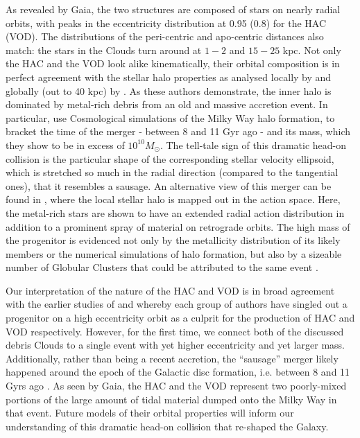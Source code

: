 \documentclass[fleqn,usenatbib]{mnras}
\begin{document}
As revealed by Gaia, the two structures are composed of stars on
nearly radial orbits, with peaks in the eccentricity distribution at
0.95 (0.8) for the HAC (VOD). The distributions of the peri-centric
and apo-centric distances also match: the stars in the Clouds turn
around at $1-2$ and $15-25$ kpc. Not only the HAC and the VOD look
alike kinematically, their orbital composition is in perfect agreement
with the stellar halo properties as analysed locally by
\citet{Belokurov2018} and globally (out to 40 kpc) by
\citet{Deason2018pileup}. As these authors demonstrate, the inner halo
is dominated by metal-rich debris from an old and massive accretion
event. In particular, \citet{Belokurov2018} use Cosmological
simulations of the Milky Way halo formation, to bracket the time of
the merger - between 8 and 11 Gyr ago - and its mass, which they show
to be in excess of $10^{10} M_{\odot}$. The tell-tale sign of this
dramatic head-on collision is the particular shape of the
corresponding stellar velocity ellipsoid, which is stretched so much
in the radial direction (compared to the tangential ones), that it
resembles a sausage. An alternative view of this merger can be found
in \citet{actionhalo}, where the local stellar halo is mapped out in
the action space. Here, the metal-rich stars are shown to have an
extended radial action distribution in addition to a prominent spray
of material on retrograde orbits. The high mass of the progenitor is
evidenced not only by the metallicity distribution of its likely
members or the numerical simulations of halo formation, but also by a
sizeable number of Globular Clusters that could be attributed to the
same event \citep[see][]{sausagegc,Kruijssen2018}.

Our interpretation of the nature of the HAC and VOD is in broad
agreement with the earlier studies of \citet{Jo2012} and \citet{Ca12}
whereby each group of authors have singled out a progenitor on a high
eccentricity orbit as a culprit for the production of HAC and VOD
respectively. However, for the first time, we connect both of the
discussed debris Clouds to a single event with yet higher eccentricity
and yet larger mass. Additionally, rather than being a recent
accretion, the ``sausage'' merger likely happened around the epoch of
the Galactic disc formation, i.e. between 8 and 11 Gyrs ago
\citep[see][]{Belokurov2018}. As seen by Gaia, the HAC and the VOD
represent two poorly-mixed portions of the large amount of tidal
material dumped onto the Milky Way in that event. Future models of
their orbital properties will inform our understanding of this
dramatic head-on collision that re-shaped the Galaxy.
\end{document}
